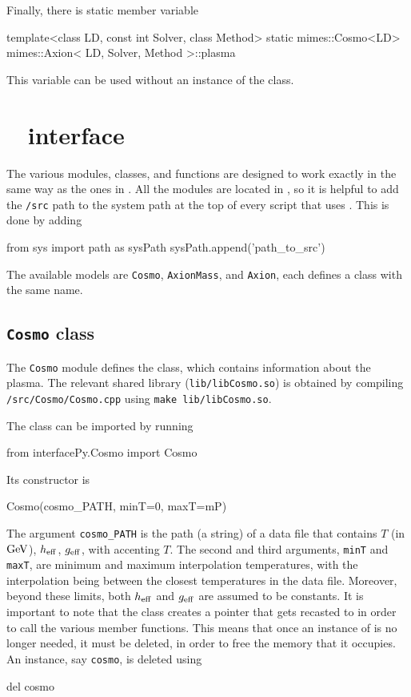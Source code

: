 \documentclass[11pt,a4paper]{article}
\begin{document}
Finally, there is static  member variable
%
\begin{cpp}
	template<class LD, const int Solver, class Method>
	static mimes::Cosmo<LD> mimes::Axion< LD, Solver, Method >::plasma
\end{cpp}
%
This variable can be used without an instance of the  class.

\section{\mimes~  \PY interface}\label{app:modules}
\setcounter{equation}{0}

The various \PY modules, classes, and functions are designed to work exactly in the same way as the ones in \CPP. All the modules are located in , so it is helpful to add the {\tt \mimes/src} path to the system path at the top of every script that uses \mimes. This is done by adding
%
\begin{py}
	from sys import path as sysPath
	sysPath.append('path_to_src')
\end{py}

The available models are {\tt Cosmo}, {\tt AxionMass}, and {\tt Axion}, each defines a class with the same name.

\subsection{{\tt Cosmo} class}
%
The {\tt Cosmo} module defines the  class, which contains information about the plasma. The relevant shared library ({\tt lib/libCosmo.so}) is obtained by compiling {\tt \mimes/src/Cosmo/Cosmo.cpp} using {\tt make lib/libCosmo.so}.
%

The class can be imported by running 
%
\begin{py}
	from interfacePy.Cosmo import Cosmo
\end{py}
%
Its constructor is
%
\begin{py}
	Cosmo(cosmo_PATH, minT=0, maxT=mP)
\end{py}
%
The argument {\tt cosmo\_PATH} is the path (a string) of a data file that contains $T$ (in ${\rm GeV}$), $h_{\rm eff}{}$, $g_{\rm eff}{}$, with accenting $T$. The second and third arguments, {\tt minT} and {\tt maxT}, are minimum and maximum interpolation temperatures, with the interpolation being between the closest temperatures in the data file. Moreover, beyond these limits, both $h_{\rm eff}{}$ and $g_{\rm eff}{}$ are assumed to be constants. It is important to note that the class creates a  pointer that gets recasted to  in order to call the various member functions. This means that once an instance of  is no longer needed, it must be deleted, in order to free the memory that it occupies. An instance, say {\tt cosmo}, is deleted using
%
\begin{py}
	del cosmo
\end{py}
\end{document}
